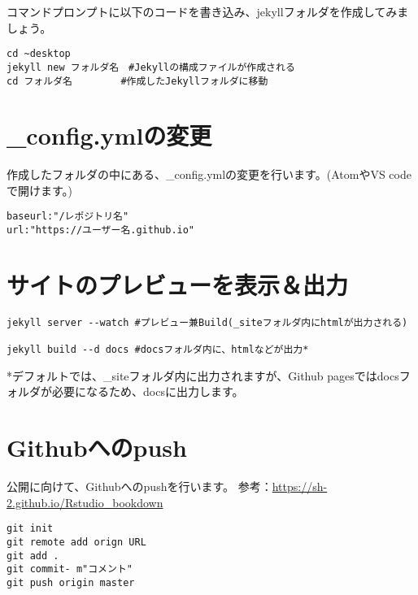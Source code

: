 \documentclass[
]{book}
\begin{document}
コマンドプロンプトに以下のコードを書き込み、jekyllフォルダを作成してみましょう。

\begin{verbatim}
cd ~desktop
jekyll new フォルダ名　#Jekyllの構成ファイルが作成される
cd フォルダ名　　　　　#作成したJekyllフォルダに移動
\end{verbatim}

\hypertarget{config.ymlux306eux5909ux66f4}{%
\section{\_config.ymlの変更}\label{config.ymlux306eux5909ux66f4}}

作成したフォルダの中にある、\_config.ymlの変更を行います。(AtomやVS codeで開けます。)

\begin{verbatim}
baseurl:"/レポジトリ名"
url:"https://ユーザー名.github.io"
\end{verbatim}

\hypertarget{ux30b5ux30a4ux30c8ux306eux30d7ux30ecux30d3ux30e5ux30fcux3092ux8868ux793aux51faux529b}{%
\section{サイトのプレビューを表示＆出力}\label{ux30b5ux30a4ux30c8ux306eux30d7ux30ecux30d3ux30e5ux30fcux3092ux8868ux793aux51faux529b}}

\begin{verbatim}
jekyll server --watch #プレビュー兼Build(_siteフォルダ内にhtmlが出力される)
 
jekyll build --d docs #docsフォルダ内に、htmlなどが出力*
\end{verbatim}

*デフォルトでは、\_siteフォルダ内に出力されますが、Github pagesではdocsフォルダが必要になるため、docsに出力します。

\hypertarget{githubux3078ux306epush}{%
\section{Githubへのpush}\label{githubux3078ux306epush}}

公開に向けて、Githubへのpushを行います。
参考：\url{https://sh-2.github.io/Rstudio_bookdown}

\begin{verbatim}
git init
git remote add orign URL
git add .
git commit- m"コメント"
git push origin master
\end{verbatim}
\end{document}
